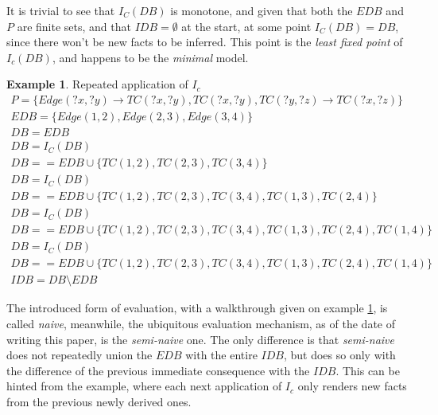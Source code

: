 \documentclass[manuscript,screen,review]{acmart}
\theoremstyle{definition}
\newtheorem{exmp}{Example}[section]
\begin{document}
It is trivial to see that $I_C(DB)$ is monotone, and given that both the $EDB$ and $P$ are finite sets, and that $IDB = \emptyset$ at the start,
at some point $I_C(DB) = DB$, since there won't be new facts to be inferred. This point is the \textit{least fixed point} of $I_c(DB)$\cite{datalog},
and happens to be the \textit{minimal} model.
\begin{exmp}{Repeated application of $I_c$}\label{ex5}
	\begin{align*}
		P = \{ Edge(?x, ?y) \rightarrow TC(?x, ?y), TC(?x, ?y), TC(?y, ?z) \rightarrow TC(?x, ?z) \} \\
		EDB = \{ Edge(1, 2), Edge(2, 3), Edge(3, 4) \}                                               \\
		DB = EDB                                                                                     \\
		DB = I_C(DB)                                                                                 \\
		DB == EDB \cup \{ TC(1, 2), TC(2, 3), TC(3, 4) \}                                            \\
		DB = I_C(DB)                                                                                 \\
		DB == EDB \cup \{ TC(1, 2), TC(2, 3), TC(3, 4), TC(1, 3), TC(2, 4) \}                        \\
		DB = I_C(DB)                                                                                 \\
		DB == EDB \cup \{ TC(1, 2), TC(2, 3), TC(3, 4), TC(1, 3), TC(2, 4), TC(1, 4) \}              \\
		DB = I_C(DB)                                                                                 \\
		DB == EDB \cup \{ TC(1, 2), TC(2, 3), TC(3, 4), TC(1, 3), TC(2, 4), TC(1, 4) \}              \\
		IDB = DB \setminus EDB
	\end{align*}
\end{exmp}
The introduced form of evaluation, with a walkthrough given on example \ref{ex5}, is called \textit{naive}, meanwhile, the ubiquitous evaluation
mechanism, as of the date of writing this paper, is the \textit{semi-naive} one. The only difference is that \textit{semi-naive} does not
repeatedly union the $EDB$ with the entire $IDB$, but does so only with the difference of the previous immediate consequence with the $IDB$. This can
be hinted from the example, where each next application of $I_c$ only renders new facts from the previous newly derived ones.
\end{document}
